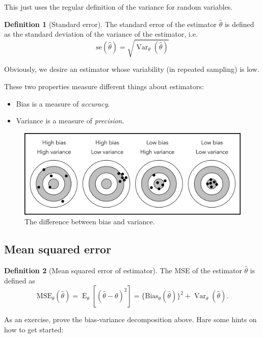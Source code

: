\documentclass[
]{book}
\providecommand{\tightlist}{%
  \setlength{\itemsep}{0pt}\setlength{\parskip}{0pt}}
\DeclareMathOperator{\E}{E}
\DeclareMathOperator{\Var}{Var}
\theoremstyle{definition}
\newtheorem{definition}{Definition}[chapter]
\theoremstyle{definition}
\theoremstyle{definition}
\theoremstyle{definition}
\theoremstyle{remark}
\begin{document}
This just uses the regular definition of the variance for random variables.

\begin{definition}[Standard error]
The standard error of the estimator \(\hat\theta\) is defined as the standard deviation of the variance of the estimator, i.e.
\[\text{se}(\hat\theta) = \sqrt{\Var_\theta(\hat\theta)}\]
\end{definition}

Obviously, we desire an estimator whose variability (in repeated sampling) is low.

These two properties measure different things about estimators:

\begin{itemize}
\tightlist
\item
  Bias is a measure of \emph{accuracy}.
\item
  Variance is a measure of \emph{precision}.
\end{itemize}

\begin{figure}

{\centering \includegraphics[width=0.8\linewidth]{figure/biasvariance1} 

}

\caption{The difference between bias and variance.}\label{fig:biasvariance}
\end{figure}

\hypertarget{mean-squared-error}{%
\subsection{Mean squared error}\label{mean-squared-error}}

\begin{definition}[Mean squared error of estimator]
The MSE of the estimator \(\hat\theta\) is defined as
\[\text{MSE}_\theta(\hat\theta) = \E_\theta\left[(\hat\theta - \theta)^2 \right] = \{\text{Bias}_\theta(\hat\theta) \}^2 + \Var_\theta(\hat\theta).\]
\end{definition}

As an exercise, prove the bias-variance decomposition above. Hare some hints on how to get started:
\end{document}
